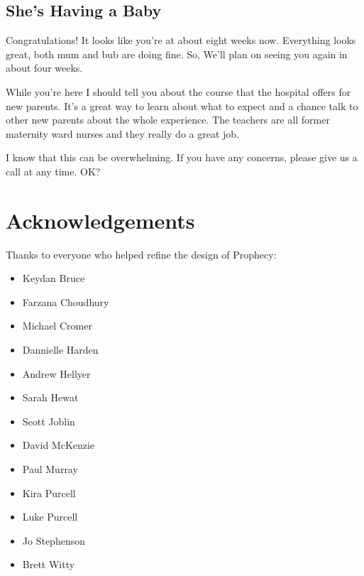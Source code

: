 \documentclass[12pt, a5paper, parskip=half-]{scrartcl}
\begin{document}
\subsection*{She's Having a Baby}
Congratulations! It looks like you're at about eight weeks now.
Everything looks great, both mum and bub are doing fine. 
So, We'll plan on seeing you again in about four weeks.

While you're here I should tell you about the course that the hospital offers for new parents.
It's a great way to learn about what to expect and a chance talk to other new parents about the whole experience. 
The teachers are all former maternity ward nurses and they really do a great job.

I know that this can be overwhelming.
If you have any concerns, please give us a call at any time. 
OK?

\newpage

\section*{Acknowledgements}
Thanks to everyone who helped refine the design of Prophecy:
\begin{multicols}{2}
\begin{itemize}
  \item Keydan Bruce
  \item Farzana Choudhury
  \item Michael Cromer
  \item Dannielle Harden
  \item Andrew Hellyer
  \item Sarah Hewat
  \item Scott Joblin
  \item David McKenzie
  \item Paul Murray
  \item Kira Purcell
  \item Luke Purcell
  \item Jo Stephenson
  \item Brett Witty
  
\end{itemize}
\end{multicols}
\end{document}
